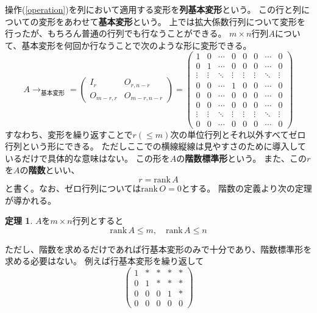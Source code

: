 \documentclass[10pt]{jsreport}
\theoremstyle{definition}%
\newtheorem{thm}{定理}[section]%
\newcommand{\kakko}[1]{\left(#1 \right)} %
\newcommand{\rank}{\mathrm{rank\,}}
\numberwithin{equation}{section}%
\begin{document}
操作(\ref{operation})を列において適用する変形を{\bf 列基本変形}という。
この行と列についての変形をあわせて{\bf 基本変形}という。
上では拡大係数行列について変形を行ったが、もちろん普通の行列でも行なうことができる。
$m\times n$行列$A$について、基本変形を何回か行なうことで次のような形に変形できる。
\begin{equation}
  A\to_{\text{基本変形}}=
  \kakko{\begin{array}{c|c} 
I_{r} & O_{r,n-r}\\ \hline
O_{m-r,r} & O_{m-r,n-r}
  \end{array}
  }=
  \kakko{\begin{array}{cccc|cccc} 
    1 & 0 & \cdots & 0 & 0 & 0 & \cdots & 0 \\ 
    0 & 1 & \cdots & 0 & 0 & 0 & \cdots & 0 \\ 
    \vdots & \vdots & \ddots & \vdots & \vdots & \vdots & \ddots & \vdots \\
    0 & 0 & \cdots & 1 & 0 & 0 & \cdots & 0 \\ \hline
    0 & 0 & \cdots & 0 & 0 & 0 & \cdots & 0 \\ 
    0 & 0 & \cdots & 0 & 0 & 0 & \cdots & 0 \\ 
    \vdots & \vdots & \ddots & \vdots & \vdots & \vdots & \ddots & \vdots \\
    0 & 0 & \cdots & 0 & 0 & 0 & \cdots & 0 
  \end{array}}
\end{equation}
すなわち、変形を繰り返すことで$r(\leq m)$次の単位行列とそれ以外すべてゼロ行列という形にできる。
ただしここでの横線縦線は見やすさのために導入しているだけで具体的な意味はない。
この形を$A$の{\bf 階数標準形}という。
また、この$r$を$A$の{\bf 階数}といい、
\begin{equation}
  r = \rank A
\end{equation}
と書く。なお、ゼロ行列については$\rank O=0$とする。
階数の定義より次の定理が導かれる。
\begin{screen}
  \begin{thm}
    $A$を$m\times n$行列とすると
    \begin{equation}
      \rank A\leq m,\quad \rank A\leq n
    \end{equation}
  \end{thm}
\end{screen}
ただし、階数を求めるだけであれば行基本変形のみで十分であり、階数標準形を求める必要はない。
例えば行基本変形を繰り返して
\begin{equation}
\label{rank3}  \begin{pmatrix}
    1 & * & * & * & * \\
    0 & 1 & * & * & * \\
    0 & 0 & 0 & 1 & * \\
    0 & 0 & 0 & 0 & 0
  \end{pmatrix}
\end{equation}
\end{document}
